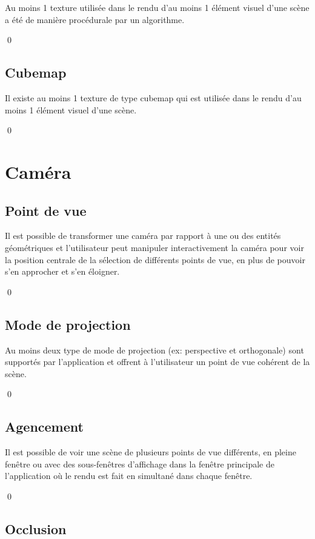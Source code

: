 \documentclass[12pt]{article}
\newcommand{\state}{\noindent}
\begin{document}
\state
Au moins 1 texture utilisée dans le rendu d'au moins 1 élément visuel d'une scène a été de manière procédurale par un algorithme.

\qed

\subsection{Cubemap}

\state
Il existe au moins 1 texture de type cubemap qui est utilisée dans le rendu d'au moins 1 élément visuel d'une scène.

\qed

\pagebreak

\section{Caméra}

\subsection{Point de vue}

\state
Il est possible de transformer une caméra par rapport à une ou des entités géométriques et l'utilisateur peut manipuler interactivement la caméra pour voir la position centrale de la sélection de différents points de vue, en plus de pouvoir s'en approcher et s'en éloigner.

\qed

\subsection{Mode de projection}

\state
Au moins deux type de mode de projection (ex: perspective et orthogonale) sont supportés par l'application et offrent à l'utilisateur un point de vue cohérent de la scène.

\qed

\subsection{Agencement}

\state
Il est possible de voir une scène de plusieurs points de vue différents, en pleine fenêtre ou avec des sous-fenêtres d'affichage dans la fenêtre principale de l'application où le rendu est fait en simultané dans chaque fenêtre.

\qed

\subsection{Occlusion}
\end{document}
